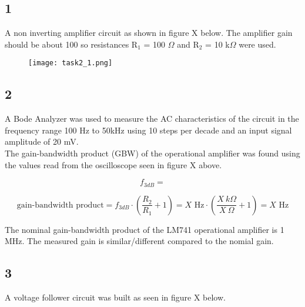 \subsection*{1}

    A non inverting amplifier circuit as shown in figure X below. The amplifier gain should be about 100 so resistances R$_1$ = 100 $\Omega$ and R$_2$ = 10 k$\Omega$ were used.

    \begin{figure}[h!]
        \centering
        \texttt{[image: task2\_1.png]}
    \end{figure}

\subsection*{2}

    A Bode Analyzer was used to measure the AC characteristics of the circuit in the frequency range 100 Hz to 50kHz using 10 steps per decade and an input signal amplitude of 20 mV.\\


    The gain-bandwidth product (GBW) of the operational amplifier was found using the values read from the oscilloscope seen in figure X above.

    $$f_{3dB} = $$

    $$\text{gain-bandwidth product} = f_{3dB} \cdot (\frac{R_2}{R_1} + 1) = X\text{ Hz} \cdot (\frac{X\ k \Omega}{X\ \Omega} + 1) = X \text{ Hz}$$

    The nominal gain-bandwidth product of the LM741 operational amplifier is 1 MHz. The measured gain is similar/different compared to the nomial gain.

\subsection*{3}

    A voltage follower circuit was built as seen in figure X below.\\
    
